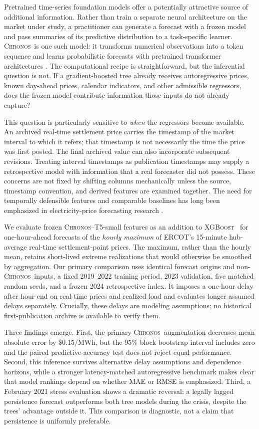 \documentclass[11pt,letterpaper]{article}
\newcommand{\MWh}{\ensuremath{\mathrm{MWh}}}
\newcommand{\Chronos}{\textsc{Chronos}}
\newcommand{\XGB}{\textsc{XGBoost}}
\begin{document}
Pretrained time-series foundation models offer a potentially attractive source of additional information. Rather than train a separate neural architecture on the market under study, a practitioner can generate a forecast with a frozen model and pass summaries of its predictive distribution to a task-specific learner. \Chronos\ is one such model: it transforms numerical observations into a token sequence and learns probabilistic forecasts with pretrained transformer architectures \citep{ansari2024chronos}. The computational recipe is straightforward, but the inferential question is not. If a gradient-boosted tree already receives autoregressive prices, known day-ahead prices, calendar indicators, and other admissible regressors, does the frozen model contribute information those inputs do not already capture?

This question is particularly sensitive to \emph{when} the regressors become available. An archived real-time settlement price carries the timestamp of the market interval to which it refers; that timestamp is not necessarily the time the price was first posted. The final archived value can also incorporate subsequent revisions. Treating interval timestamps as publication timestamps may supply a retrospective model with information that a real forecaster did not possess. These concerns are not fixed by shifting columns mechanically unless the source, timestamp convention, and derived features are examined together. The need for temporally defensible features and comparable baselines has long been emphasized in electricity-price forecasting research \citep{lago2021review}.

We evaluate frozen \Chronos--T5-small features as an addition to \XGB\ \citep{chen2016xgboost} for one-hour-ahead forecasts of the \emph{hourly maximum} of ERCOT's 15-minute hub-average real-time settlement-point prices. The maximum, rather than the hourly mean, retains short-lived extreme realizations that would otherwise be smoothed by aggregation. Our primary comparison uses identical forecast origins and non-\Chronos\ inputs, a fixed 2019--2022 training period, 2023 validation, five matched random seeds, and a frozen 2024 retrospective index. It imposes a one-hour delay after hour-end on real-time prices and realized load and evaluates longer assumed delays separately. Crucially, these delays are modeling assumptions; no historical first-publication archive is available to verify them.

Three findings emerge. First, the primary \Chronos\ augmentation decreases mean absolute error by \$0.15/\MWh, but the 95\% block-bootstrap interval includes zero and the paired predictive-accuracy test does not reject equal performance. Second, this inference survives alternative delay assumptions and dependence horizons, while a stronger latency-matched autoregressive benchmark makes clear that model rankings depend on whether MAE or RMSE is emphasized. Third, a February 2021 stress evaluation shows a dramatic reversal: a legally lagged persistence forecast outperforms both tree models during the crisis, despite the trees' advantage outside it. This comparison is diagnostic, not a claim that persistence is uniformly preferable.
\end{document}
